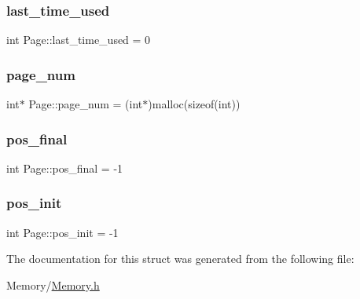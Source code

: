 \mbox{\label{structPage_ad70f7dec34533dba242936c6ed355204}} 
\subsubsection{\texorpdfstring{last\+\_\+time\+\_\+used}{last\_time\_used}}
{\footnotesize\ttfamily int Page\+::last\+\_\+time\+\_\+used = 0}

\mbox{\label{structPage_abc4c8ba4637ce55a6488bbb25c97f049}} 
\subsubsection{\texorpdfstring{page\+\_\+num}{page\_num}}
{\footnotesize\ttfamily int$\ast$ Page\+::page\+\_\+num = (int$\ast$)malloc(sizeof(int))}

\mbox{\label{structPage_a06b632e2575f8aad90c07ccf11fa7421}} 
\subsubsection{\texorpdfstring{pos\+\_\+final}{pos\_final}}
{\footnotesize\ttfamily int Page\+::pos\+\_\+final = -\/1}

\mbox{\label{structPage_a7bf30edd2a48811beb04f0d23228aefc}} 
\subsubsection{\texorpdfstring{pos\+\_\+init}{pos\_init}}
{\footnotesize\ttfamily int Page\+::pos\+\_\+init = -\/1}



The documentation for this struct was generated from the following file\+:\begin{DoxyCompactItemize}
\item 
Memory/\mbox{\hyperlink{Memory_8h}{Memory.\+h}}\end{DoxyCompactItemize}
